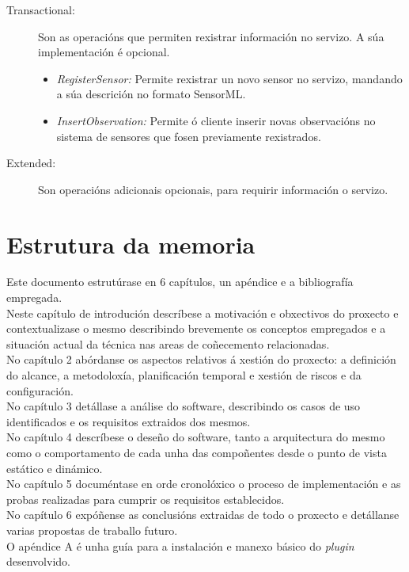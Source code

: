 \begin{description}
\begin{itemize}
\end{itemize}
\item[Transactional:] Son as operacións que permiten rexistrar información no servizo. A súa implementación é opcional.
\begin{itemize}
\item \textit{RegisterSensor:} Permite rexistrar un novo sensor no servizo, mandando a súa descrición no formato SensorML.
\item \textit{InsertObservation:} Permite ó cliente inserir novas observacións no sistema de sensores que fosen previamente rexistrados.
\end{itemize}
\item[Extended:] Son operacións adicionais opcionais, para requirir información o servizo.
\end{description}

\section{Estrutura da memoria}

Este documento estrutúrase en 6 capítulos, un apéndice e a bibliografía empregada.\\

Neste capítulo de introdución descríbese a motivación e obxectivos do proxecto e contextualizase o mesmo describindo brevemente os conceptos empregados e a situación actual da técnica nas areas de coñecemento relacionadas.\\

No capítulo 2 abórdanse os aspectos relativos á xestión do proxecto: a definición do alcance, a metodoloxía, planificación temporal e xestión de riscos e da configuración.\\

No capítulo 3 detállase a análise do software, describindo os casos de uso identificados e os requisitos extraidos dos mesmos.\\

No capítulo 4 descríbese o deseño do software, tanto a arquitectura do mesmo como o comportamento de cada unha das compoñentes desde o punto de vista estático e dinámico.\\

No capítulo 5 documéntase en orde cronolóxico o proceso de implementación e as probas realizadas para cumprir os requisitos establecidos.\\

No capítulo 6 expóñense as conclusións extraidas de todo o proxecto e detállanse varias propostas de traballo futuro.\\

O apéndice A é unha guía para a instalación e manexo básico do \emph{plugin} desenvolvido.\\
